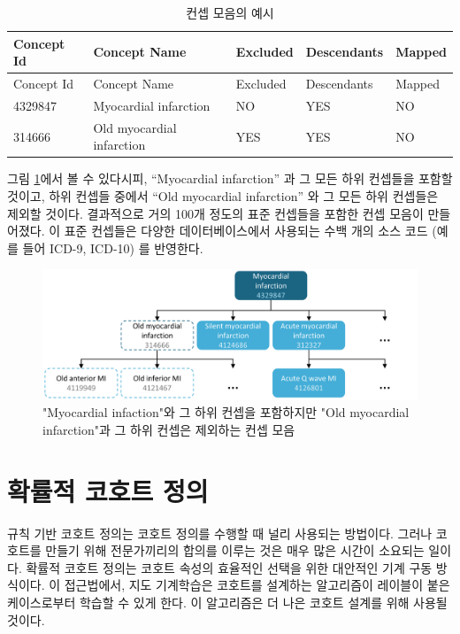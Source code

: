 \documentclass[11pt]{book}
\theoremstyle{definition}
\theoremstyle{definition}
\theoremstyle{definition}
\theoremstyle{remark}
\begin{document}
\begin{longtable}[]{@{}lllll@{}}
\caption{\label{tab:conceptSetExpression} 컨셉 모음의 예시}\tabularnewline
\toprule
Concept Id & Concept Name & Excluded & Descendants &
Mapped\tabularnewline
\midrule
\endfirsthead
\toprule
Concept Id & Concept Name & Excluded & Descendants &
Mapped\tabularnewline
\midrule
\endhead
4329847 & Myocardial infarction & NO & YES & NO\tabularnewline
314666 & Old myocardial infarction & YES & YES & NO\tabularnewline
\bottomrule
\end{longtable}

그림 \ref{fig:conceptSet}에서 볼 수 있다시피, ``Myocardial infarction''
과 그 모든 하위 컨셉들을 포함할 것이고, 하위 컨셉들 중에서 ``Old
myocardial infarction'' 와 그 모든 하위 컨셉들은 제외할 것이다.
결과적으로 거의 100개 정도의 표준 컨셉들을 포함한 컨셉 모음이
만들어졌다. 이 표준 컨셉들은 다양한 데이터베이스에서 사용되는 수백 개의
소스 코드 (예를 들어 ICD-9, ICD-10) 를 반영한다.

\begin{figure}

{\centering \includegraphics[width=1\linewidth]{images/Cohorts/conceptSet} 

}

\caption{"Myocardial infaction"와 그 하위 컨셉을 포함하지만 "Old myocardial infarction"과 그 하위 컨셉은 제외하는 컨셉 모음}\label{fig:conceptSet}
\end{figure}

\section{확률적 코호트 정의}\label{--}

규칙 기반 코호트 정의는 코호트 정의를 수행할 때 널리 사용되는 방법이다.
그러나 코호트를 만들기 위해 전문가끼리의 합의를 이루는 것은 매우 많은
시간이 소요되는 일이다. 확률적 코호트 정의는 코호트 속성의 효율적인
선택을 위한 대안적인 기계 구동 방식이다. 이 접근법에서, 지도 기계학습은
코호트를 설계하는 알고리즘이 레이블이 붙은 케이스로부터 학습할 수 있게
한다. 이 알고리즘은 더 나은 코호트 설계를 위해 사용될 것이다.
\end{document}
